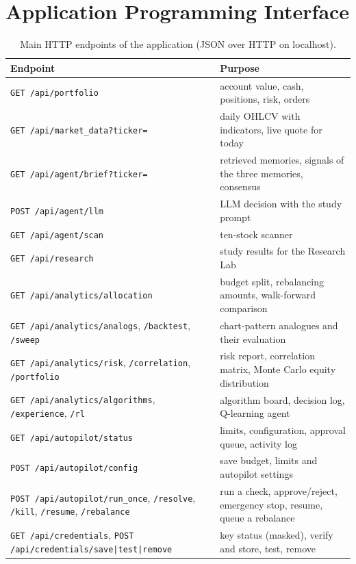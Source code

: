 \chapter{Application Programming Interface}
\label{app:api}

\begin{table}[H]
\centering
\small
\caption{Main HTTP endpoints of the application (JSON over HTTP on localhost).}
\label{tab:api}
\begin{tabular}{p{}p{}}
\toprule
Endpoint & Purpose \\
\midrule
\texttt{GET /api/portfolio} & account value, cash, positions, risk, orders \\
\texttt{GET /api/market\_data?ticker=} & daily OHLCV with indicators, live quote for today \\
\texttt{GET /api/agent/brief?ticker=} & retrieved memories, signals of the three memories, consensus \\
\texttt{POST /api/agent/llm} & LLM decision with the study prompt \\
\texttt{GET /api/agent/scan} & ten-stock scanner \\
\texttt{GET /api/research} & study results for the Research Lab \\
\texttt{GET /api/analytics/allocation} & budget split, rebalancing amounts, walk-forward comparison \\
\texttt{GET /api/analytics/analogs}, \texttt{/backtest}, \texttt{/sweep} & chart-pattern analogues and their evaluation \\
\texttt{GET /api/analytics/risk}, \texttt{/correlation}, \texttt{/portfolio} & risk report, correlation matrix, Monte Carlo equity distribution \\
\texttt{GET /api/analytics/algorithms}, \texttt{/experience}, \texttt{/rl} & algorithm board, decision log, Q-learning agent \\
\texttt{GET /api/autopilot/status} & limits, configuration, approval queue, activity log \\
\texttt{POST /api/autopilot/config} & save budget, limits and autopilot settings \\
\texttt{POST /api/autopilot/run\_once}, \texttt{/resolve}, \texttt{/kill}, \texttt{/resume}, \texttt{/rebalance} & run a check, approve/reject, emergency stop, resume, queue a rebalance \\
\texttt{GET /api/credentials}, \texttt{POST /api/credentials/save|test|remove} & key status (masked), verify and store, test, remove \\
\bottomrule
\end{tabular}
\end{table}

